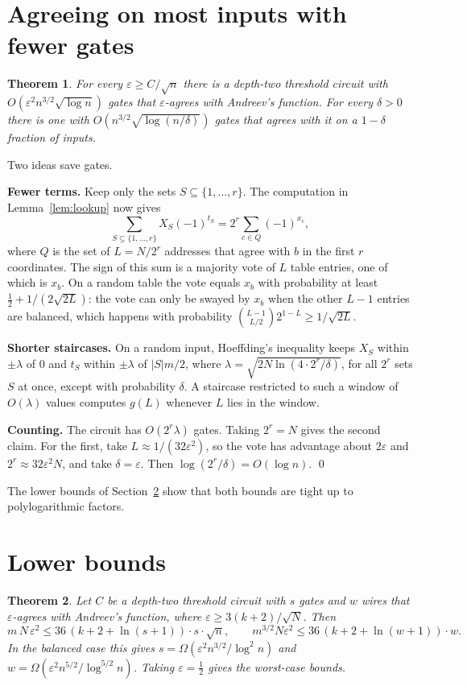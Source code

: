 \documentclass[11pt,letterpaper]{article}
\newtheorem{theorem}{Theorem}
\newcommand{\sect}[1]{\section{\color{ink}#1}}
\newcommand{\smalltitle}[1]{\textbf{\color{ink}#1}\quad}
\begin{document}
\sect{Agreeing on most inputs with fewer gates}\label{sec:avgupper}

\begin{theorem}\label{thm:avgupper}
For every $\varepsilon\ge C/\sqrt n$ there is a depth-two threshold circuit
with $O(\varepsilon^2n^{3/2}\sqrt{\log n})$ gates that $\varepsilon$-agrees
with Andreev's function. For every $\delta>0$ there is one with
$O(n^{3/2}\sqrt{\log(n/\delta)})$ gates that agrees with it on a $1-\delta$
fraction of inputs.
\end{theorem}

Two ideas save gates.

\smalltitle{Fewer terms.}
Keep only the sets $S\subseteq\{1,\dots,r\}$. The computation in
Lemma~\ref{lem:lookup} now gives
\[
\sum_{S\subseteq\{1,\dots,r\}}X_S(-1)^{t_S}=2^r\sum_{c\in Q}(-1)^{x_c},
\]
where $Q$ is the set of $L=N/2^r$ addresses that agree with $b$ in the first
$r$ coordinates. The sign of this sum is a majority vote of $L$ table
entries, one of which is $x_b$. On a random table the vote equals $x_b$ with
probability at least $\tfrac12+1/(2\sqrt{2L})$: the vote can only be swayed
by $x_b$ when the other $L-1$ entries are balanced, which happens with
probability $\binom{L-1}{L/2}2^{1-L}\ge 1/\sqrt{2L}$.

\smalltitle{Shorter staircases.}
On a random input, Hoeffding's inequality keeps $X_S$ within $\pm\lambda$ of $0$
and $t_S$ within $\pm\lambda$ of $|S|m/2$, where $\lambda=\sqrt{2N\ln(4\cdot2^r/\delta)}$,
for all $2^r$ sets $S$ at once, except with probability $\delta$.
A staircase restricted to such a window of $O(\lambda)$ values computes
$g(L)$ whenever $L$ lies in the window.

\smalltitle{Counting.}
The circuit has $O(2^r\lambda)$ gates. Taking $2^r=N$ gives the second claim.
For the first, take $L\approx1/(32\varepsilon^2)$, so the vote has advantage
about $2\varepsilon$ and $2^r\approx32\varepsilon^2N$, and take $\delta=\varepsilon$.
Then $\log(2^r/\delta)=O(\log n)$. \qed

The lower bounds of Section~\ref{sec:lower} show that both bounds are tight up
to polylogarithmic factors.

\sect{Lower bounds}\label{sec:lower}

\begin{theorem}\label{thm:lower}
Let $C$ be a depth-two threshold circuit with $s$ gates and $w$ wires that
$\varepsilon$-agrees with Andreev's function, where
$\varepsilon\ge3(k+2)/\sqrt N$. Then
\[
m\,N\,\varepsilon^2\le 36\,(k+2+\ln(s+1))\cdot s\cdot\sqrt n,
\qquad
m^{3/2}N\varepsilon^2\le 36\,(k+2+\ln(w+1))\cdot w .
\]
In the balanced case this gives $s=\Omega(\varepsilon^2n^{3/2}/\log^2n)$
and $w=\Omega(\varepsilon^2n^{5/2}/\log^{5/2}n)$. Taking $\varepsilon=\tfrac12$
gives the worst-case bounds.
\end{theorem}
\end{document}
